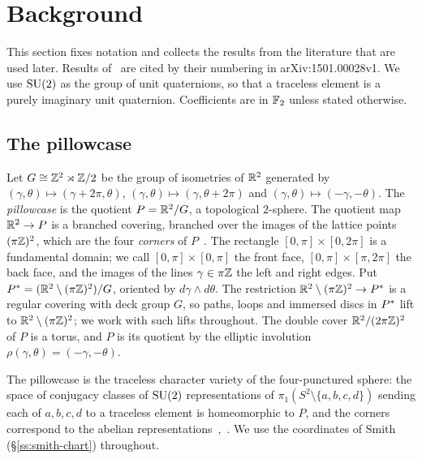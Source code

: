 \section{Background}\label{sec:background}

This section fixes notation and collects the results from the literature that are used later. Results
of~\cite{HHK2} are cited by their numbering in arXiv:1501.00028v1. We use $\mathrm{SU}(2)$ as the group of unit
quaternions, so that a traceless element is a purely imaginary unit quaternion. Coefficients are in $\mathbb{F}_2$
unless stated otherwise.

\subsection{The pillowcase}\label{ss:pillowcase}
Let $G\cong\mathbb{Z}^2\rtimes\mathbb{Z}/2$ be the group of isometries of $\mathbb{R}^2$ generated by
$(\gamma,\theta)\mapsto(\gamma+2\pi,\theta)$, $(\gamma,\theta)\mapsto(\gamma,\theta+2\pi)$ and
$(\gamma,\theta)\mapsto(-\gamma,-\theta)$. The \emph{pillowcase} is the quotient $P=\mathbb{R}^2/G$, a topological
$2$-sphere. The quotient map $\mathbb{R}^2\to P$ is a branched covering, branched over the images of the lattice points
$(\pi\mathbb{Z})^2$, which are the four \emph{corners} of $P$~\cite[\S3.1]{HHK2}. The rectangle $[0,\pi]\times[0,2\pi]$ is
a fundamental domain; we call $[0,\pi]\times[0,\pi]$ the front face, $[0,\pi]\times[\pi,2\pi]$ the back face, and
the images of the lines $\gamma\in\pi\mathbb{Z}$ the left and right edges. Put $P^{*}=(\mathbb{R}^2\setminus(\pi\mathbb{Z})^2)/G$, oriented
by $d\gamma\wedge d\theta$. The restriction $\mathbb{R}^2\setminus(\pi\mathbb{Z})^2\to P^{*}$ is a regular covering with deck group
$G$, so paths, loops and immersed discs in $P^{*}$ lift to $\mathbb{R}^2\setminus(\pi\mathbb{Z})^2$; we work with such lifts
throughout. The double cover $\mathbb{R}^2/(2\pi\mathbb{Z})^2$ of $P$ is a torus, and $P$ is its quotient by the elliptic
involution $\rho(\gamma,\theta)=(-\gamma,-\theta)$.

The pillowcase is the traceless character variety of the four-punctured sphere: the space of conjugacy
classes of $\mathrm{SU}(2)$ representations of $\pi_1(S^2\setminus\{a,b,c,d\})$ sending each of $a,b,c,d$ to a traceless
element is homeomorphic to $P$, and the corners correspond to the abelian
representations~\cite[Prop.~3.1]{HHK1},~\cite[Prop.~6.1]{HHK2}. We use the coordinates of Smith
(\S\ref{ss:smith-chart}) throughout.

